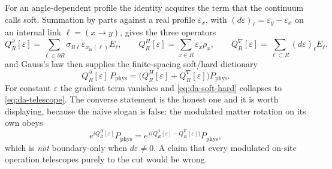 For an angle-dependent profile the identity acquires the term that the
continuum calls soft. Summation by parts against a real profile
$\varepsilon_x$, with $(d\varepsilon)_\ell=\varepsilon_y-\varepsilon_x$ on an
internal link $\ell=(x\to y)$, gives the three operators
\begin{equation}
  Q^{\partial}_R[\varepsilon]=\sum_{\ell\in\partial R}\sigma_{R\ell}
      \varepsilon_{x_{\mathrm{in}}(\ell)}E_\ell,
  \qquad
  Q^{H}_R[\varepsilon]=\sum_{x\in R}\varepsilon_x\rho_x,
  \qquad
  Q^{\nabla}_R[\varepsilon]=\sum_{\ell\subset R}(d\varepsilon)_\ell E_\ell,
  \label{eq:da-three-charges}
\end{equation}
and Gauss's law then supplies the finite-spacing soft/hard dictionary
\begin{equation}
  \boxed{\;
  Q^{\partial}_R[\varepsilon]\,P_{\mathrm{phys}}
  =\bigl(Q^{H}_R[\varepsilon]+Q^{\nabla}_R[\varepsilon]\bigr)P_{\mathrm{phys}} .\;}
  \label{eq:da-soft-hard}
\end{equation}
For constant $\varepsilon$ the gradient term vanishes and
\eqref{eq:da-soft-hard} collapses to \eqref{eq:da-telescope}. The converse
statement is the honest one and it is worth displaying, because the naive
slogan is false: the modulated matter rotation on its own obeys
\begin{equation}
  e^{iQ^{H}_R[\varepsilon]}P_{\mathrm{phys}}
  =e^{\,i\bigl(Q^{\partial}_R[\varepsilon]-Q^{\nabla}_R[\varepsilon]\bigr)}P_{\mathrm{phys}},
  \label{eq:da-not-boundary-only}
\end{equation}
which is \emph{not} boundary-only when $d\varepsilon\neq0$. A claim that every
modulated on-site operation telescopes purely to the cut would be wrong.


